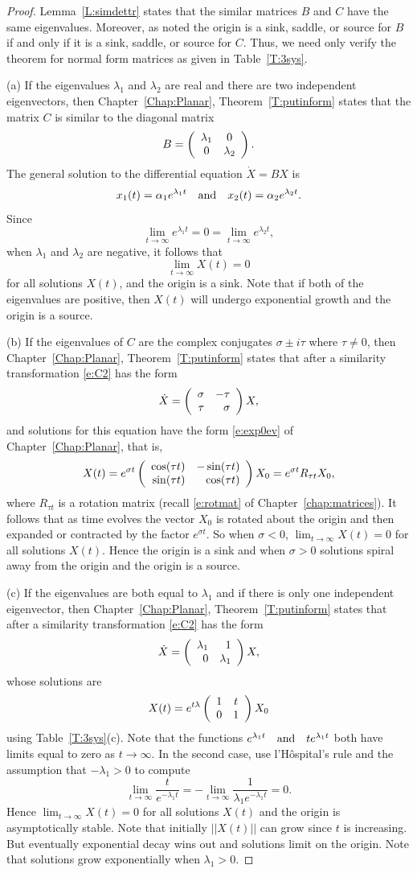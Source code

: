 \documentclass{ximera}
\begin{document}
\begin{proof}  
Lemma~\ref{L:simdettr} states that the similar matrices $B$ and $C$ have the 
same eigenvalues.  Moreover, as noted the origin is a sink, saddle, or source for 
$B$ if and only if it is a sink, saddle, or source for $C$.  Thus, we need only verify 
the theorem for normal form matrices as given in Table~\ref{T:3sys}. 

\noindent (a) \quad If the eigenvalues $\lambda_1$ and $\lambda_2$ are real
and there are two independent eigenvectors, then Chapter~\ref{Chap:Planar},
Theorem~\ref{T:putinform} states that the matrix $C$ is similar to the
diagonal matrix
\[
B = \left(\begin{array}{cc} \lambda_1 & 0\\ 0 &\lambda_2\end{array}\right).
\]
The general solution to the differential equation $\dot{X}=BX$ is
\[
x_1(t) = \alpha_1e^{\lambda_1 t} \quad\mbox{and}\quad x_2(t) = \alpha_2e^{\lambda_2 t}.
\]
Since
\[
\lim_{t\to\infty}e^{\lambda_1 t} = 0  = \lim_{t\to\infty}e^{\lambda_2 t},
\]
when $\lambda_1$ and $\lambda_2$ are negative, it follows that
\[
\lim_{t\to\infty} X(t) = 0
\]
for all solutions $X(t)$, and the origin is a sink.  Note that if both of 
the eigenvalues are positive, then $X(t)$ will undergo exponential 
growth and the origin is a source.

\noindent (b) \quad If the eigenvalues of $C$ are the complex conjugates
$\sigma\pm i\tau$ where $\tau\neq 0$, then Chapter~\ref{Chap:Planar},
Theorem~\ref{T:putinform} states that after a similarity transformation
\eqref{e:C2} has the form
\[
\dot{X} = \left(\begin{array}{rr} \sigma & -\tau\\ \tau &\sigma\end{array}\right)X,
\]
and solutions for this equation have the form \eqref{e:exp0ev} of
Chapter~\ref{Chap:Planar}, that is,
\[
X(t) = e^{\sigma t}
\left(\begin{array}{rr} \cos(\tau t) & -\sin(\tau t)\\ \sin(\tau t) &\cos(\tau t)\end{array}\right)X_0
= e^{\sigma t}R_{\tau t}X_0,
\]
where $R_{\tau t}$ is a rotation matrix
(recall \eqref{e:rotmat} of
Chapter~\ref{chap:matrices}).  It follows that as time evolves
the vector $X_0$ is rotated about the origin and then expanded or contracted
by the factor $e^{\sigma t}$.  So when $\sigma<0$, $\lim_{t\to\infty} X(t)=0$
for all solutions $X(t)$.  Hence the origin is a sink and when $\sigma > 0$ 
solutions spiral away from the origin and the origin is a source.

\noindent (c) \quad If the eigenvalues are both equal to $\lambda_1$
and if there is only one independent eigenvector, then
Chapter~\ref{Chap:Planar}, Theorem~\ref{T:putinform} states that after a
similarity transformation \eqref{e:C2} has the form
\[
\dot{X} = \left(\begin{array}{rr} \lambda_1 & 1\\ 0 &\lambda_1\end{array}\right)X,
\]
whose solutions are
\[
X(t) = e^{t\lambda}\left(\begin{array}{cc} 1 & t\\ 0 &1\end{array}\right) X_0
\]
using Table~\ref{T:3sys}(c). Note that the functions
$e^{\lambda_1 t} \quad\mbox{and}\quad te^{\lambda_1 t}$ both have limits equal to zero as
$t\to\infty$.  In the second case, use l'H\^{o}spital's rule and the
assumption that $-\lambda_1>0$ to compute
\[
\lim_{t\to\infty} \frac{t}{e^{-\lambda_1 t}} =
  -\lim_{t\to\infty} \frac{1}{\lambda_1 e^{-\lambda_1 t}} = 0.
\]
Hence $\lim_{t\to\infty} X(t) = 0$ for all solutions $X(t)$ and the origin
is asymptotically stable.  Note that initially $||X(t)||$ can grow since
$t$ is increasing.  But eventually exponential decay wins out and solutions
limit on the origin.   Note that solutions grow exponentially when
$\lambda_1 > 0$.  
\end{proof}
\end{document}
